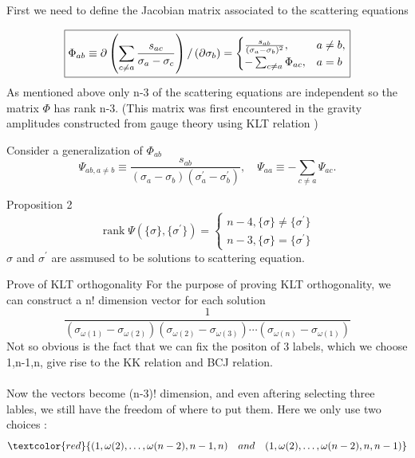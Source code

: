 \documentclass{beamer}
\begin{document}
\begin{frame}
    First we need to define the Jacobian matrix associated to the scattering equations
        
        \begin{equation*}
            \boxed{
            \label{jacobbi}
            \Phi_{ab}\equiv\partial\left(\sum_{c\neq a}\frac{s_{ac}}{\sigma_a-\sigma_c}\right)/\left(\partial\sigma_b\right)=\begin{cases}\frac{s_{ab}}{(\sigma_a-\sigma_b)^2},&a\neq b,\\-\sum_{c\neq a}\Phi_{ac}, &a=b\end{cases}
            }
        \end{equation*}
    As mentioned above only n-3 of the scattering equations are independent so the matrix $\Phi$ has \alert{rank n-3}.  (This matrix was first encountered in the gravity amplitudes constructed from gauge theory using KLT relation ) 
\end{frame}
\begin{frame}
    Consider a generalization of $\Phi_{ab}$ 
    \begin{equation*}
        \Psi_{ab,a\neq b}\equiv\frac{s_{ab}}{(\sigma_a-\sigma_b)(\sigma_a^{\prime}-\sigma_b^{\prime})},\quad\Psi_{aa}\equiv-\sum_{c\neq a}\Psi_{ac}.
    \end{equation*}
    \begin{block}{Proposition 2}
        \begin{equation*}
            \operatorname{rank}\Psi(\{\sigma\},\{\sigma^{\prime}\})=\begin{cases}n-4, \{\sigma\}\neq\{\sigma^{\prime}\}\\n-3, \{\sigma\}=\{\sigma^{\prime}\}\end{cases}
        \end{equation*}
        $\sigma$ and $\sigma^\prime$ are assmused to be solutions to scattering equation.
    \end{block}
\end{frame}
\begin{frame}{Prove of KLT orthogonality}
    For the purpose of proving KLT orthogonality, we can construct a n! dimension vector for each solution
    \begin{equation*}
        \frac1{(\sigma_{\omega(1)}-\sigma_{\omega(2)})(\sigma_{\omega(2)}-\sigma_{\omega(3)})\cdots(\sigma_{\omega(n)}-\sigma_{\omega(1)})}
    \end{equation*}
    Not so obvious is the fact that we can fix the positon of 3 labels, which we choose 1,n-1,n, give rise to the KK relation and BCJ relation.
    \\ \hspace*{\fill}\\
    Now the vectors become (n-3)! dimension, and even aftering selecting three lables, we still have the freedom of where to put them. Here we only use two choices :
    \begin{equation*}
        \textcolor{red}{(1,\omega(2),\dots,\omega(n-2),n-1,n)\quad and \quad (1,\omega(2),\dots,\omega(n-2),n,n-1 )}
    \end{equation*}
\end{frame}
\end{document}
